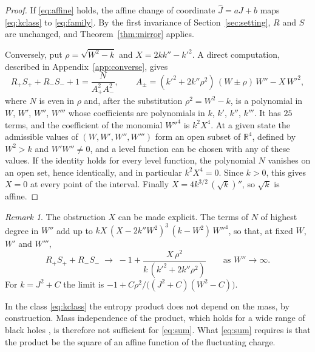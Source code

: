 \documentclass[11pt]{article}
\theoremstyle{definition}
\theoremstyle{remark}
\newtheorem{remark}{Remark}
\begin{document}
\begin{proof}
If \eqref{eq:affine} holds, the affine change of coordinate $\hat J=aJ+b$ maps \eqref{eq:kclass} to \eqref{eq:family}. By the first invariance of Section~\ref{sec:setting}, $R$ and $S$ are unchanged, and Theorem~\ref{thm:mirror} applies.

Conversely, put $\rho=\sqrt{W^{2}-k}$ and $X=2kk''-k'^{2}$. A direct computation, described in Appendix~\ref{app:converse}, gives
\begin{equation}\label{eq:NDelta}
R_{+}S_{+}+R_{-}S_{-}+1=\frac{N}{A_{+}^{2}A_{-}^{2}},
\qquad
A_{\pm}=(k'^{2}+2k''\rho^{2})\,(W\pm\rho)\,W''-X\,W'^{2} ,
\end{equation}
where $N$ is even in $\rho$ and, after the substitution $\rho^{2}=W^{2}-k$, is a polynomial in $W$, $W'$, $W''$, $W'''$ whose coefficients are polynomials in $k$, $k'$, $k''$, $k'''$. It has $25$ terms, and the coefficient of the monomial $W''^{4}$ is $k^{2}X^{4}$. At a given state the admissible values of $(W,W',W'',W''')$ form an open subset of $\mathbb{R}^{4}$, defined by $W^{2}>k$ and $W'W''\neq0$, and a level function can be chosen with any of these values. If the identity holds for every level function, the polynomial $N$ vanishes on an open set, hence identically, and in particular $k^{2}X^{4}=0$. Since $k>0$, this gives $X=0$ at every point of the interval. Finally $X=4k^{3/2}\,(\sqrt k)''$, so $\sqrt k$ is affine.
\end{proof}

\begin{remark}\label{rem:limit}
The obstruction $X$ can be made explicit. The terms of $N$ of highest degree in $W''$ add up to $kX\,(X-2k''W^{2})^{3}\,(k-W^{2})\,W''^{4}$, so that, at fixed $W$, $W'$ and $W'''$,
\begin{equation}\label{eq:limit}
R_{+}S_{+}+R_{-}S_{-}\;\longrightarrow\;-1+\frac{X\,\rho^{2}}{k\,(k'^{2}+2k''\rho^{2})}
\qquad\text{as } W''\to\infty .
\end{equation}
For $k=J^{2}+C$ the limit is $-1+C\rho^{2}/\bigl((J^{2}+C)(W^{2}-C)\bigr)$.
\end{remark}

In the class \eqref{eq:kclass} the entropy product does not depend on the mass, by construction. Mass independence of the product, which holds for a wide range of black holes \cite{CGP}, is therefore not sufficient for \eqref{eq:sum}. What \eqref{eq:sum} requires is that the product be the square of an affine function of the fluctuating charge.
\end{document}
